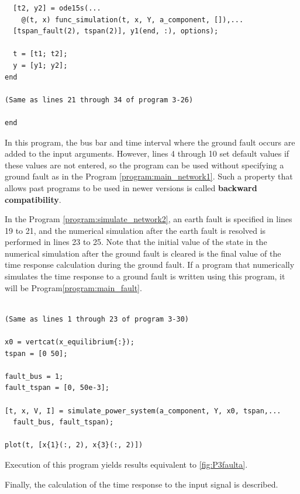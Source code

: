 \documentclass[graybox, envcountchap]{svmult}
\begin{document}
\begin{example}
\begin{PROGRAMA}[count,title={simulate\_power\_system.m}]
\begin{verbatim}
  [t2, y2] = ode15s(...
    @(t, x) func_simulation(t, x, Y, a_component, []),...
  [tspan_fault(2), tspan(2)], y1(end, :), options);

  t = [t1; t2];
  y = [y1; y2];
end

(Same as lines 21 through 34 of program 3-26)

end
\end{verbatim}
\end{PROGRAMA}

In this program, the bus bar and time interval where the ground fault occurs are added to the input arguments.
However, lines 4 through 10 set default values if these values are not entered, so the program can be used without specifying a ground fault as in the Program \nobreak\ref{program:main_network1}.
Such a property that allows past programs to be used in newer versions is called \textbf{backward compatibility}.

In the Program \nobreak\ref{program:simulate_network2}, an earth fault is specified in lines 19 to 21, and the numerical simulation after the earth fault is resolved is performed in lines 23 to 25.
Note that the initial value of the state in the numerical simulation after the ground fault is cleared is the final value of the time response calculation during the ground fault.
If a program that numerically simulates the time response to a ground fault is written using this program, it will be Program\nobreak\ref{program:main_fault}.

\smallskip
\begin{PROGRAMA}[count,title={main\_simulation\_3bus\_fault.m}]\label{program:main_fault}
\begin{verbatim}

(Same as lines 1 through 23 of program 3-30)

x0 = vertcat(x_equilibrium{:});
tspan = [0 50];

fault_bus = 1;
fault_tspan = [0, 50e-3];

[t, x, V, I] = simulate_power_system(a_component, Y, x0, tspan,...
  fault_bus, fault_tspan);

plot(t, [x{1}(:, 2), x{3}(:, 2)])
\end{verbatim}
\end{PROGRAMA}

Execution of this program yields results equivalent to \ref{fig:P3faulta}.
\end{example}

Finally, the calculation of the time response to the input signal is described.
\end{document}
